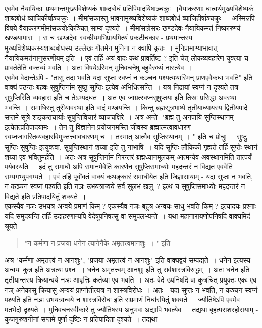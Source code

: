 {~\\[0.2cm]
एवमेव नैयायिकाः प्रथमान्तमुख्यविशेष्यकं शाब्दबोधं प्रतिपिपादयिषाञ्चक्रुः~।\break वैयाकरणाः धात्वर्थमुख्यविशेष्यकं शाब्दबोधं व्याचिकीर्षाञ्चक्रुः~। मीमांसकास्तु भावनामुख्य\-विशेष्यकं शाब्दबोधं व्याजिहीर्षाञ्चक्रुः~। अस्मिन्नपि विषये वैयाकरणमीमांसकयोः\break किञ्चित् साम्यं दृश्यते~। मीमांसाग्रेसरः खण्डदेवः नैयायिकमतं निष्कारुण्यं खण्डयामास~। स च खण्डदेवः स्वकीयमभिप्रायमित्थं प्रकटीचकार - प्रथमान्तस्य मुख्यविशेष्यकस्य\break शाब्दबोधस्य उल्लेखः गौतमेन मुनिना न क्वापि कृतः~। मुनिप्रामाण्याभावात् नैयायिकमतं\break नानुसरणीयम् इति~। एवं तर्हि अयं वादः कथं प्रावर्तिष्ट ? इति चेत् लोकव्यवहारेण युक्त्या च प्रावर्ततेति वक्तव्यं भवति~। अतः विषयेऽस्मिन् मुनिवचनेषु बहुवैरुध्यं नास्त्येव~। 
~\\[0.2cm]
एवमेव वेदान्तेऽपि - "तासु तदा भवति यदा सुप्तः स्वप्नं न कञ्चन पश्यत्यथास्मिन् प्राण\break एवैकधा भवति" इति वाक्यं पठन्तः बहवः सुषुप्तिर्नाम सुष्ठु सुप्तिः इत्येव अभिधित्सन्ति~। यत्र निद्रायां स्वप्नं न दृश्यते तत्र सुषुप्तिरिति व्यवहारः इति च तेऽभ्यदधत~। अत एव जाग्रत्स्वप्नसुषुप्तयः इति तिस्रः प्रसिद्धा अवस्था भवन्ति~। समाधिस्तु तुरीयावस्था इति वादं मण्डयन्ति~। किन्तु ब्रह्मसूत्रभाष्ये तृतीयाध्यायस्य द्वितीयपादे सप्तमे सूत्रे शङ्कराचार्याः सुषुप्तिविचारं \hbox{व्याचचक्षिरे~।} अत्र अन्ते -"ब्रह्म तु अनपायि सुप्तिस्थानम् - इत्येतत्प्रतिपादयामः~। तेन तु विज्ञानेन प्रयोजनमस्ति जीवस्य ब्रह्मात्मत्वावधारणं स्वप्नजागरितव्यवहारविमुक्तत्त्वावधारणम् च~। तस्मात् आत्मैव सुप्तिस्थानम्~। " इति च प्रोचुः~। सुष्टु सुप्तिः सुषुप्तिः इत्युक्त्वा, सुषुप्तिस्थानं शय्या इति तु नाभाषि~। यदि सुप्तिः लौकिकी गृह्यते तर्हि सुप्तेः स्थानं शय्या एव भवितुमर्हति~। अतः अत्र सुषुप्तिर्नाम निरन्तरं ब्रह्मध्यानमूलकम् आत्मन्येव अवस्थानमिति तात्पर्यं पर्यवस्यति~। इदं तु समाधौ अपि समानमेवेति कारणेन सुषुप्तिसमाध्योः महदन्तरं न विद्यत एववेति सम्यगभ्युपगम्यते~। एवं तर्हि पूर्वोक्तं वाक्यं कथङ्कारं समाधीयेत इति जिज्ञासायाम् - यदा सुप्तः न भवति, न कञ्चन स्वप्नं पश्यति इति नञः उभयत्रान्वये सर्वं सुलभं खलु~? इत्थं च सुषुप्तिसमाध्योः महदन्तरं न विद्यते इति प्रतिपादयितुं शक्यते~। 
~\\[0.2cm]
एकस्यैव नञः उभयत्र अन्वये प्रमाणं किम् ? एकस्यैव नञः बहुत्र अन्वयः साधु भवति किम् ? इत्यादयः प्रश्नाः यदि समुदयन्ति तर्हि उदाहरणान्यपि वेदेषूपनिषत्सु वा समुपलभ्यन्ते~। यथा महानारायणोपनिषदि वाक्यमिदं श्रूयते - 
\begin{verse}
"न कर्मणा न प्रजया धनेन त्यागेनैके अमृतत्त्वमानशुः~। " इति
\end{verse}
अत्र "कर्मणा अमृतत्त्वं न आनशुः", "प्रजया अमृतत्त्वं न आनशुः" इति वाक्यद्वयं सम्पद्यते~। धनेन इत्यस्य अन्वयः कुत्र इति अत्रत्यः प्रश्नः~। धनेन अमृतत्त्वम् आनशुः इति तु सर्वशास्त्रविरुद्धम्~। अतः धनेन इति तृतीयान्तस्य क्रियान्वये नञः आवृत्तिः कर्तव्या एव भवति~। अतः वेदे उपनिषदि वा कुत्रचित् प्रयुक्तः एकः एव नञ् अनेकासु क्रियासु अन्वयं प्राप्नोतीत्यत्र न शास्त्रविरोधः~। अतः - यदा सुप्तः न भवति, न कञ्चन स्वप्नं पश्यति इति नञः उभयत्रान्वये न शास्त्रविरोधः इति सप्रमाणं निर्धारयितुं शक्यते~। ज्यौतिषेऽपि एवमेव मतभेदो दृश्यते~। मुनिवचनस्वीकारे तु ज्यौतिषस्य अनुभवः अद्यापि भवत्येव~। तद्यथा बृहत्पराशरहोरायाम् - कुजगुरुशनीनां सप्तमे पूर्णा दृष्टिः न प्रतिपादिता दृश्यते~। तद्यथा -
}
